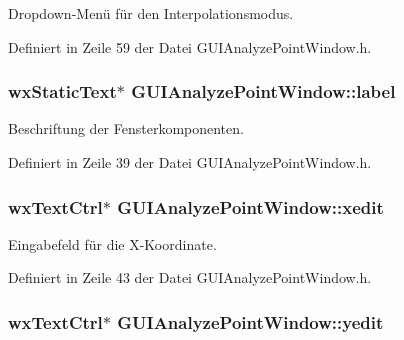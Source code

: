 Dropdown-\/\-Menü für den Interpolationsmodus. 



Definiert in Zeile 59 der Datei G\-U\-I\-Analyze\-Point\-Window.\-h.

\hypertarget{classGUIAnalyzePointWindow_ae3f474800a7f7d9e4a897bdf33510f01}{
\subsubsection[{label}]{\setlength{\rightskip}{0pt plus 5cm}wx\-Static\-Text$\ast$ G\-U\-I\-Analyze\-Point\-Window\-::label\hspace{0.3cm}{\ttfamily [private]}}}\label{classGUIAnalyzePointWindow_ae3f474800a7f7d9e4a897bdf33510f01}


Beschriftung der Fensterkomponenten. 



Definiert in Zeile 39 der Datei G\-U\-I\-Analyze\-Point\-Window.\-h.

\hypertarget{classGUIAnalyzePointWindow_a4c3d50b2c5c38b8b757cdb1c04ea83b6}{
\subsubsection[{xedit}]{\setlength{\rightskip}{0pt plus 5cm}wx\-Text\-Ctrl$\ast$ G\-U\-I\-Analyze\-Point\-Window\-::xedit\hspace{0.3cm}{\ttfamily [private]}}}\label{classGUIAnalyzePointWindow_a4c3d50b2c5c38b8b757cdb1c04ea83b6}


Eingabefeld für die X-\/\-Koordinate. 



Definiert in Zeile 43 der Datei G\-U\-I\-Analyze\-Point\-Window.\-h.

\hypertarget{classGUIAnalyzePointWindow_ac4352df05ac2a001551801a90fc8bc42}{
\subsubsection[{yedit}]{\setlength{\rightskip}{0pt plus 5cm}wx\-Text\-Ctrl$\ast$ G\-U\-I\-Analyze\-Point\-Window\-::yedit\hspace{0.3cm}{\ttfamily [private]}}}\label{classGUIAnalyzePointWindow_ac4352df05ac2a001551801a90fc8bc42}


